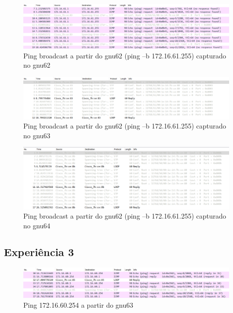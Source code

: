 \documentclass[article, a4paper, 11pt, oneside]{memoir}
\begin{document}
\begin{figure}[h]
	\centering
\includegraphics[scale=0.55]{exp2-step10-broadcast-gnu62-from-gnu62.png}
\caption{Ping broadcast a partir do gnu62 (ping –b 172.16.61.255) capturado no gnu62}
\end{figure}

\begin{figure}[h]
	\centering
\includegraphics[scale=0.55]{exp2-step10-broadcast-gnu62-from-gnu63.png}
\caption{Ping broadcast a partir do gnu62 (ping –b 172.16.61.255) capturado no gnu63}
\end{figure}

\begin{figure}[h]
	\centering
\includegraphics[scale=0.55]{exp2-step10-broadcast-gnu62-from-gnu64.png}
\caption{Ping broadcast a partir do gnu62 (ping –b 172.16.61.255) capturado no gnu64}
\end{figure}

\newpage
\subsection{Experiência 3}
\begin{figure}[h]
	\centering
\includegraphics[scale=0.55]{exp3-step6-ping-60.254-from-gnu63.png}
\caption{Ping 172.16.60.254 a partir do gnu63}
\end{figure}
\end{document}
